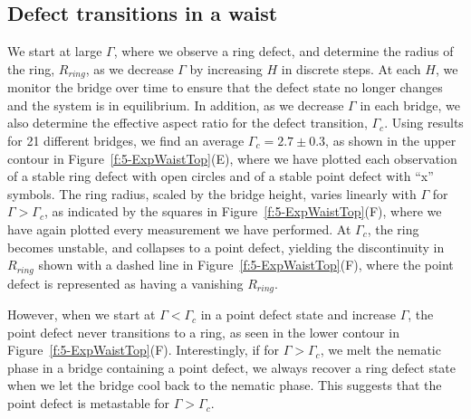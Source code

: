 \subsection{Defect transitions in a waist}
We start at large $\Gamma$, where we observe a ring defect, and determine the radius of the ring, $R_{ring}$, as we decrease $\Gamma$ by increasing $H$ in discrete steps.
At each $H$, we monitor the bridge over time to ensure that the defect state no longer changes and the system is in equilibrium.
In addition, as we decrease $\Gamma$ in each bridge, we also determine the effective aspect ratio for the defect transition, $\Gamma_c$.
Using results for 21 different bridges, we find an average $\Gamma_c = 2.7 \pm 0.3$, as shown in the upper contour in Figure~\ref{f:5-ExpWaistTop}(E), where we have plotted each observation of a stable ring defect with open circles and of a stable point defect with ``x'' symbols.
The ring radius, scaled by the bridge height, varies linearly with $\Gamma$ for $\Gamma > \Gamma_c$, as indicated by the squares in Figure~\ref{f:5-ExpWaistTop}(F), where we have again plotted every measurement we have performed.
At $\Gamma_c$, the  ring becomes unstable, and collapses to a point defect, yielding the discontinuity in $R_{ring}$ shown with a dashed line in Figure~\ref{f:5-ExpWaistTop}(F), where the point defect is represented as having a vanishing $R_{ring}$.

However, when we start at $\Gamma < \Gamma_c$ in a point defect state and increase $\Gamma$, the point defect never transitions to a ring, as seen in the lower contour in Figure~\ref{f:5-ExpWaistTop}(F).
Interestingly, if for $\Gamma > \Gamma_c$, we melt the nematic phase in a bridge containing a point defect, we always  recover a ring defect state when we let the bridge cool back to the nematic phase.
This suggests that the point defect is metastable for $\Gamma > \Gamma_c$.


